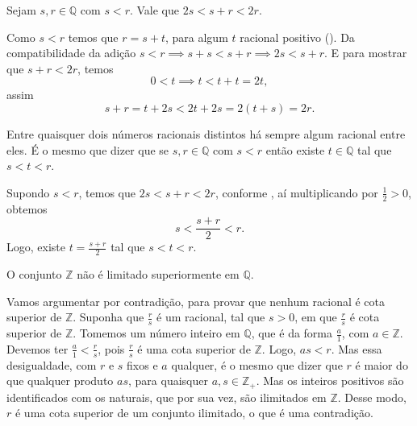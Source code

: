 \documentclass[../main.tex]{subfiles}
\begin{document}
\begin{prop}\label{rac-prop-somaEntreDobro}
    Sejam $s, r \in \mathbb{Q}$ com $s < r$. Vale que $2s < s+r < 2r$.
\end{prop}
\begin{dem}
    Como $s < r$ temos que $r = s + t$, para algum $t$ racional positivo ().
    Da compatibilidade da adição $s< r \implies s+s < s+r \implies 2s < s+r$.
    E para mostrar que $s+r < 2r$, temos
    \[ 0 < t \implies t < t+t = 2t, \] 
    assim 
    \[ s+r =  t+2s < 2t+2s = 2(t+s) = 2r. \] 
\end{dem}

\begin{corol}\label{rac-corol-terceiroEntreDois}
    Entre quaisquer dois números racionais distintos há sempre algum racional entre eles. É o mesmo que dizer
    que se $s,r \in \mathbb{Q}$ com $s<r$ então existe $t \in \mathbb{Q}$ tal que  $s < t < r$.
\end{corol}
\begin{dem}
    Supondo $s < r$, temos que $2s < s+r < 2r$, conforme , aí multiplicando por $\frac{1}{2} > 0$, obtemos 
    \[ s < \frac{s+r}{2} < r. \]
    Logo, existe $t = \frac{s+r}{2}$ tal que $s < t < r$.
\end{dem}

\begin{teo}\label{rac-teo-ilimitadoSuperiormente}
    O conjunto $\mathbb{Z}$ não é limitado superiormente em $\mathbb{Q}$.
\end{teo}
\begin{dem}
    Vamos argumentar por contradição, para provar que nenhum racional é cota superior de $\mathbb{Z}$.
    Suponha que $\frac{r}{s}$ é um racional, tal que $s>0$, em que $\frac{r}{s}$ é cota superior de $\mathbb{Z}$. Tomemos um número inteiro em $\mathbb{Q}$, que é da forma $\frac{a}{1}$, com $a \in \mathbb{Z}$. Devemos ter $\frac{a}{1} < \frac{r}{s}$, pois $\frac{r}{s}$ é uma cota superior de $\mathbb{Z}$. Logo, $as < r$. Mas essa desigualdade, com $r$ e $s$ fixos e $a$ qualquer, é o mesmo que dizer que $r$ é maior do que qualquer produto $as$, para quaisquer $a,s \in \mathbb{Z}_{+}$. Mas os inteiros positivos são identificados com os naturais, que por sua vez, são ilimitados em $\mathbb{Z}$. Desse modo, $r$ é uma cota superior de um conjunto ilimitado, o que é uma contradição.
\end{dem}
\end{document}

